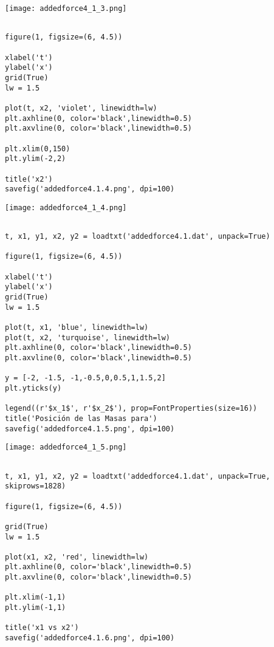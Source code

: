 \documentclass{article} %
\begin{document}
\begin{center}
	\texttt{[image: addedforce4\_1\_3.png]}
\end{center}



\begin{verbatim} 

figure(1, figsize=(6, 4.5))

xlabel('t')
ylabel('x')
grid(True)
lw = 1.5

plot(t, x2, 'violet', linewidth=lw)
plt.axhline(0, color='black',linewidth=0.5)
plt.axvline(0, color='black',linewidth=0.5)

plt.xlim(0,150)
plt.ylim(-2,2)

title('x2')
savefig('addedforce4.1.4.png', dpi=100)

\end{verbatim}


\begin{center}
	\texttt{[image: addedforce4\_1\_4.png]}
\end{center}


\begin{verbatim} 

t, x1, y1, x2, y2 = loadtxt('addedforce4.1.dat', unpack=True)

figure(1, figsize=(6, 4.5))

xlabel('t')
ylabel('x')
grid(True)
lw = 1.5

plot(t, x1, 'blue', linewidth=lw)
plot(t, x2, 'turquoise', linewidth=lw)
plt.axhline(0, color='black',linewidth=0.5)
plt.axvline(0, color='black',linewidth=0.5)

y = [-2, -1.5, -1,-0.5,0,0.5,1,1.5,2]
plt.yticks(y)

legend((r'$x_1$', r'$x_2$'), prop=FontProperties(size=16))
title('Posición de las Masas para')
savefig('addedforce4.1.5.png', dpi=100)

\end{verbatim}


\begin{center}
	\texttt{[image: addedforce4\_1\_5.png]}
\end{center}


\begin{verbatim} 

t, x1, y1, x2, y2 = loadtxt('addedforce4.1.dat', unpack=True, skiprows=1828)

figure(1, figsize=(6, 4.5))

grid(True)
lw = 1.5

plot(x1, x2, 'red', linewidth=lw)
plt.axhline(0, color='black',linewidth=0.5)
plt.axvline(0, color='black',linewidth=0.5)

plt.xlim(-1,1)
plt.ylim(-1,1)

title('x1 vs x2')
savefig('addedforce4.1.6.png', dpi=100)


\end{verbatim}
\end{document}
